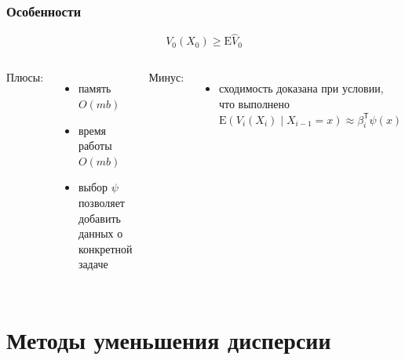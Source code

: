 \documentclass[unicode, notheorems]{beamer}
\newcommand{\E}{\mathrm{E}}
\newcommand{\Vhat}{\hat{V}}
\begin{document}
		\begin{frame}
		\frametitle{Особенности}
			$$V_0(X_0) \geq \E\Vhat_0$$
			\begin{columns}[T]
				Плюсы:
				\begin{itemize}
					\item память $O(mb)$
					\item время работы $O(mb)$
					\item выбор $\psi$ позволяет добавить данных о конкретной задаче
				\end{itemize}
				Минус:
				\begin{itemize}
					\item сходимость доказана при условии, что выполнено $\E\left(V_i(X_i)\middle\vert X_{i-1} = x\right) \approx \beta_i^\mathsf{T}\psi(x)$
				\end{itemize}
			\end{columns}
		\end{frame}

\section{Методы уменьшения дисперсии} %
\label{sec:variance reduction}
\end{document}
